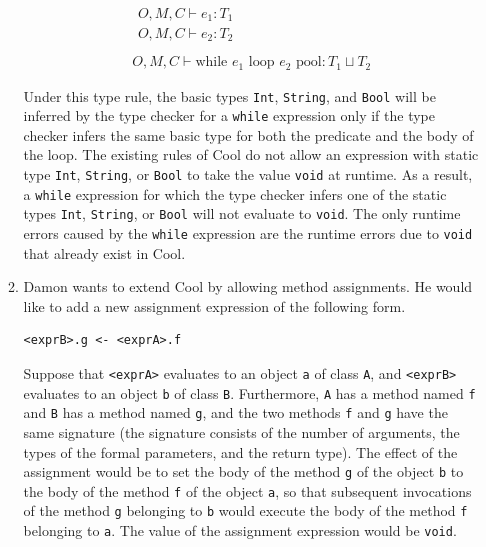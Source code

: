 \documentclass[11pt]{article}
\begin{document}
\begin{enumerate}
\begin{enumerate}
\begin{equation}
\begin{array}{c}
\begin{array}{l}
O, M, C \vdash e_{1} : T_{1} \\
O, M, C \vdash e_{2} : T_{2} \\
\end{array} \\
\hline
O, M, C \vdash \text{while } e_{1} \text{ loop } e_{2} \text{ pool} :
T_{1} \sqcup T_{2}
\end{array}
\tag*{[Loop]}
\end{equation}

Under this type rule, the basic types \texttt{Int}, \texttt{String},
and \texttt{Bool} will be inferred by the type checker for a
\texttt{while} expression only if the type checker infers the same
basic type for both the predicate and the body of the loop.  The
existing rules of Cool do not allow an expression with static type
\texttt{Int}, \texttt{String}, or \texttt{Bool} to take the value
\texttt{void} at runtime.  As a result, a \texttt{while} expression
for which the type checker infers one of the static types
\texttt{Int}, \texttt{String}, or \texttt{Bool} will not evaluate to
\texttt{void}.  The only runtime errors caused by the \texttt{while}
expression are the runtime errors due to \texttt{void} that already
exist in Cool.

\item Damon wants to extend Cool by allowing method assignments.  He
would like to add a new assignment expression of the following form.
\begin{verbatim}
<exprB>.g <- <exprA>.f
\end{verbatim}
\noindent
Suppose that \texttt{<exprA>} evaluates to an object \texttt{a} of
class \texttt{A}, and \texttt{<exprB>} evaluates to an object
\texttt{b} of class \texttt{B}.  Furthermore, \texttt{A} has a method
named \texttt{f} and \texttt{B} has a method named \texttt{g}, and
the two methods \texttt{f} and \texttt{g} have the same signature (the
signature consists of the number of arguments, the types of the formal
parameters, and the return type).  The effect of the assignment would
be to set the body of the method \texttt{g} of the object \texttt{b}
to the body of the method \texttt{f} of the object \texttt{a}, so that
subsequent invocations of the method \texttt{g} belonging to
\texttt{b} would execute the body of the method \texttt{f} belonging
to \texttt{a}.  The value of the assignment expression would be
\texttt{void}.


\end{enumerate}
\end{enumerate}
\end{document}
